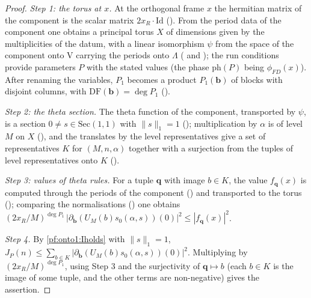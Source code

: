 \begin{proof}
\emph{Step 1: the torus at $x$.} At the orthogonal frame $x$ the hermitian matrix of the component is the scalar matrix
$2x_R\cdot\mathrm{Id}$ (). From the period data of the component one obtains a
principal torus $X$ of dimensions given by the multiplicities of the datum, with a linear isomorphism $\psi$ from the space of
the component onto $\mathrm V$ carrying the periods onto $\Lambda$ ( and
); the run conditions provide parameters $P$ with the stated
values (the phase $\mathrm{ph}(P)$ being $\phi_{FD}(x)$). After renaming the variables, $P_1$ becomes a product $P_1(\mathbf b)$ of blocks with
disjoint columns, with $\mathrm{DF}(\mathbf b)=\deg P_1$ ().

\emph{Step 2: the theta section.} The theta function of the component, transported by $\psi$, is a section $0\ne s\in\mathrm{Sec}(1,1)$
with $\|s\|_1=1$ (); multiplication by $\alpha$ is of level $M$ on $X$
(), and the translates by the level representatives give a set of
representatives $K$ for $(M,n,\alpha)$ together with a surjection from the tuples of level representatives onto $K$
().

\emph{Step 3: values of theta rules.} For a tuple $\mathbf q$ with image $b\in K$, the value $f_{\mathbf q}(x)$ is computed through the
periods of the component () and transported to the torus
(); comparing the normalisations () one
obtains $(2x_R/M)^{\deg P_1}\,|\partial_{\mathbf b}(U_M(b)s_0(\alpha,s))(0)|^2\le|f_{\mathbf q}(x)|^2$.

\emph{Step 4.} By \cref{pf:onto1:Iholds} with $\|s\|_1=1$, $J_P(n)\le\sum_{b\in K}|\partial_{\mathbf b}(U_M(b)s_0(\alpha,s))(0)|^2$. Multiplying by
$(2x_R/M)^{\deg P_1}$, using Step 3 and the surjectivity of $\mathbf q\mapsto b$ (each $b\in K$ is the image of some tuple, and the other
terms are non-negative) gives the assertion.
\end{proof}

